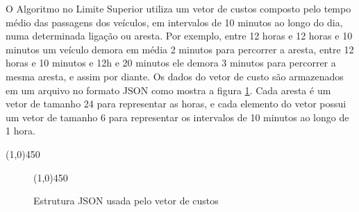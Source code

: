 O Algoritmo no Limite Superior utiliza um vetor de custos composto pelo tempo médio das passagens dos veículos, em intervalos
de 10 minutos ao longo do dia, numa determinada ligação ou aresta. Por exemplo, entre 12 horas e 12 horas e 10 minutos um
veículo demora em média 2 minutos para percorrer a aresta, entre 12 horas e 10 minutos e 12h e 20 minutos ele demora 3 minutos
para percorrer a mesma aresta, e assim por diante. Os dados do vetor de custo são armazenados em um arquivo no formato JSON
como mostra a figura \ref{fig:tabelajson}. Cada aresta é um vetor de tamanho 24 para representar as horas, e cada elemento
do vetor possui um vetor de tamanho 6 para representar os intervalos de 10 minutos ao longo de 1 hora.
\begin{center}
  \line(1,0){450}
\end{center}

\begin{figure}[htbp]
  \begin{center}
    \line(1,0){450}
  \end{center}
  \centering
  \caption{Estrutura JSON usada pelo vetor de custos}
  \label{fig:tabelajson}
\end{figure}
\FloatBarrier

